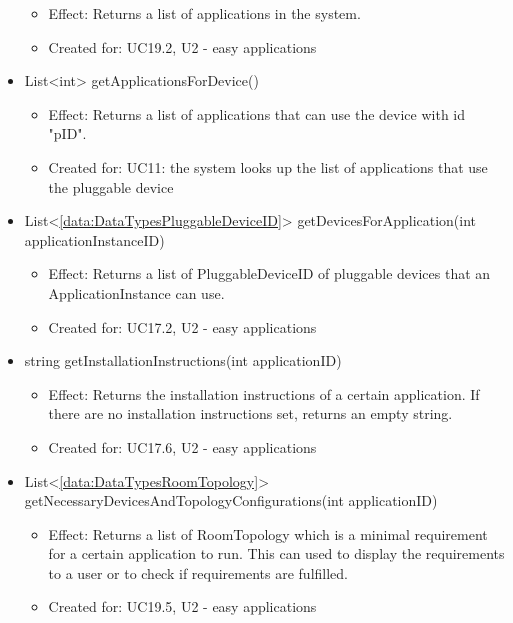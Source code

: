 \begin{description}
\begin{itemize}[noitemsep,nolistsep,leftmargin=-.25cm]
        \begin{itemize}[noitemsep,nolistsep]
           \item Effect: Returns a list of applications in the system.
\item Created for: UC19.2, U2 - easy applications
        \end{itemize}
      \item \textsf{List\textless{}int\textgreater{} getApplicationsForDevice()}
        \begin{itemize}[noitemsep,nolistsep]
           \item Effect: Returns a list of applications that can use the device with id "pID".
\item Created for: UC11: the system looks up the list of applications that use the pluggable device
        \end{itemize}
      \item \textsf{List\textless{}\ref{data:DataTypesPluggableDeviceID}\textgreater{} getDevicesForApplication(int applicationInstanceID)}
        \begin{itemize}[noitemsep,nolistsep]
           \item Effect: Returns a list of PluggableDeviceID of pluggable devices that an ApplicationInstance can use.
\item Created for: UC17.2, U2 - easy applications
        \end{itemize}
      \item \textsf{string getInstallationInstructions(int applicationID)}
        \begin{itemize}[noitemsep,nolistsep]
           \item Effect: Returns the installation instructions of a certain application. If there are no installation instructions set, returns an empty string.
\item Created for: UC17.6, U2 - easy applications
        \end{itemize}
      \item \textsf{List\textless{}\ref{data:DataTypesRoomTopology}\textgreater{} getNecessaryDevicesAndTopologyConfigurations(int applicationID)}
        \begin{itemize}[noitemsep,nolistsep]
           \item Effect: Returns a list of RoomTopology which is a minimal requirement for a certain application to run. This can used to display the requirements to a user or to check if requirements are fulfilled.
\item Created for: UC19.5, U2 - easy applications

\end{itemize}
\end{itemize}
\end{description}
